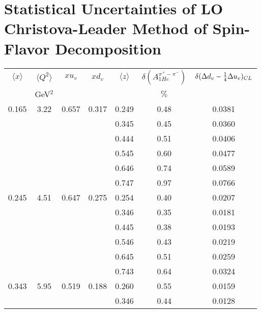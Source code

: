 \section{ Statistical Uncertainties of LO Christova-Leader Method of Spin-Flavor Decomposition}
\begin{table}[htbp]
\begin{center}
\begin{tabular}{|ccccc||c|c|}
\hline
$\langle x \rangle $   & $ \langle Q^2 \rangle $   & $x  u_v$ & $x d_v$ & $\langle z \rangle$ & $\delta \left(A_{1He}^{\pi^+ - \pi^-} \right)$  &
$\delta ( \Delta d_v -{1 \over 4} \Delta u_v )_{CL}$  \\
                       & GeV$^2$              &          &    &       &  $\%$    &                                                              \\ \hline \hline
   0.165 &    3.22 &   0.657 &    0.317 &    0.249 &      0.48 &    0.0381 \\
         &          &          &          &    0.345 &      0.45 &    0.0360 \\
         &          &          &          &    0.444 &      0.51 &    0.0406 \\
         &          &          &          &    0.545 &      0.60 &    0.0477 \\
         &          &          &          &    0.646 &      0.74 &    0.0589 \\
         &          &          &          &    0.747 &      0.97 &    0.0766 \\
   0.245 &    4.51 &   0.647 &    0.275 &    0.254 &      0.40 &    0.0207 \\
         &          &          &          &    0.346 &      0.35 &    0.0181 \\
         &          &          &          &    0.445 &      0.38 &    0.0193 \\
         &          &          &          &    0.546 &      0.43 &    0.0219 \\
         &          &          &          &    0.645 &      0.51 &    0.0259 \\
         &          &          &          &    0.743 &      0.64 &    0.0324 \\
   0.343 &    5.95 &   0.519 &    0.188 &    0.260 &      0.55 &    0.0159 \\
         &          &          &          &    0.346 &      0.44 &    0.0128 \\

\end{tabular}
\end{center}
\end{table}
